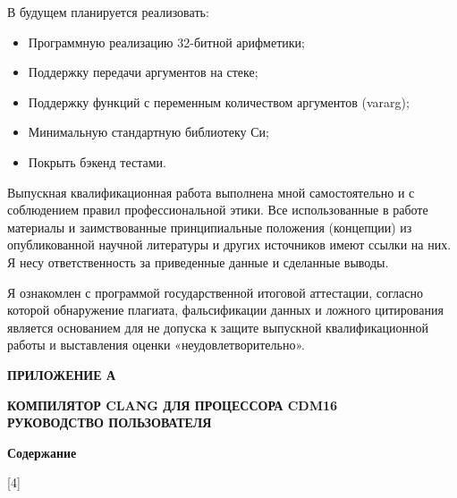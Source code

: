 \documentclass[a4paper,14pt]{extarticle}
\newcounter{IsInsideAppendixToc}
\begin{document}
В будущем планируется реализовать:
\begin{itemize}
	\item Программную реализацию 32-битной арифметики;
	\item Поддержку передачи аргументов на стеке;
	\item Поддержку функций с переменным количеством аргументов (vararg);
	\item Минимальную стандартную библиотеку Си;
	\item Покрыть бэкенд тестами.
\end{itemize}

Выпускная квалификационная работа выполнена мной самостоятельно и с соблюдением правил профессиональной этики. Все использованные в работе материалы и заимствованные принципиальные положения (концепции) из опубликованной научной литературы и других источников имеют ссылки на них. Я несу ответственность за приведенные данные и сделанные выводы.

Я ознакомлен с программой государственной итоговой аттестации, согласно которой обнаружение плагиата, фальсификации данных и ложного цитирования является основанием для не допуска к защите выпускной квалификационной работы и выставления оценки «неудовлетворительно».




\pagebreak
\printbibliography
{}


\newpage
\begin{center}
	\textbf{\large ПРИЛОЖЕНИЕ А}
\end{center}
\vspace*{\fill}
	\begin{center}
		\textbf{\large КОМПИЛЯТОР CLANG ДЛЯ ПРОЦЕССОРА CDM16\\РУКОВОДСТВО ПОЛЬЗОВАТЕЛЯ}
	\end{center}
\vspace*{\fill}
\newpage
\setcounter{section}{0}


\setcounter{IsInsideAppendixToc}{1}

\textbf{\Large Содержание}


\startcontents[chapters]
[4]{}

\pagebreak
\end{document}
